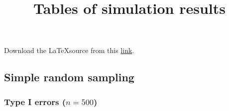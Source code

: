 \documentclass[
]{article}
\title{Tables of simulation results}
\author{}
\date{\vspace{-2.5em}}
\begin{document}
\maketitle

{
\setcounter{tocdepth}{3}
\tableofcontents
}
Download the \LaTeX source from this
\href{https://raw.githubusercontent.com/haziqj/lavaan.bingof/gh-pages/articles/sim_tables.tex}{link}.

\hypertarget{simple-random-sampling}{%
\subsection{Simple random sampling}\label{simple-random-sampling}}

\hypertarget{type-i-errors-n500}{%
\subsubsection{\texorpdfstring{Type I errors
(\(n=500\))}{Type I errors (n=500)}}\label{type-i-errors-n500}}
\end{document}
